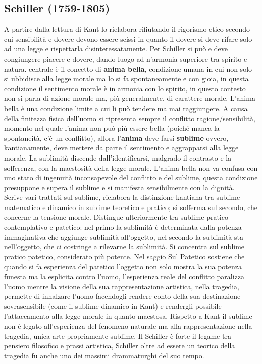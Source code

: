 \documentclass[10pt,a4paper]{article}
\begin{document}
\subsection{Schiller (1759-1805)}
A partire dalla lettura di Kant lo rielabora rifiutando il rigorismo etico secondo cui sensibilità e dovere devono essere scissi in quanto il dovere si deve rifare solo ad una legge e rispettarla disinteressatamente. Per Schiller si può e deve congiungere piacere e dovere, dando luogo ad n'armonia superiore tra spirito e natura. centrale è il concetto di \textbf{anima bella}, condizione umana in cui non solo si ubbidisce alla legge morale ma lo si fa spontaneamente e con gioia, in questa condizione il sentimento morale è in armonia con lo spirito, in questo contesto non si parla di azione morale ma, più generalmente, di carattere morale. L'anima bella è una condizione limite a cui li può tendere ma mai raggiungere. A causa della finitezza fisica dell'uomo si ripresenta sempre il conflitto ragione/sensibilità, momento nel quale l'anima non può più essere bella (poiché manca la spontaneità, c'è un conflitto), allora l'\textbf{anima} deve farsi \textbf{sublime} ovvero, kantianamente, deve mettere da parte il sentimento e aggrapparsi alla legge morale. La sublimità discende dall'identificarsi, malgrado il contrasto e la sofferenza, con la maestosità della legge morale. L'anima bella non va confusa con uno stato di ingenuità inconsapevole del conflitto e del sublime, questa condizione presuppone e supera il sublime e si manifesta sensibilmente con la dignità.\\
Scrive vari trattati sul sublime, rielabora la distinzione kantiana tra sublime matematico e dinamico in sublime teoretico e pratico; si sofferma sul secondo, che concerne la tensione morale. Distingue ulteriormente tra sublime pratico contemplativo e patetico: nel primo la sublimità è determinata dalla potenza immaginativa che aggiunge sublimità all'oggetto, nel secondo la sublimità sta nell'oggetto, che ci costringe a rilevarne la sublimità. Si concentra sul sublime pratico patetico, considerato più potente. Nel saggio Sul Patetico sostiene che quando si fa esperienza del patetico l'oggetto non solo mostra la sua potenza funesta ma la esplicita contro l'uomo, l'esperienza reale del conflitto paralizza l'uomo mentre la visione della sua rappresentazione artistica, nella tragedia, permette di innalzare l'uomo facendogli rendere conto della sua destinazione sovrasensibile (come il sublime dinamico in Kant) e rendergli possibile l'attaccamento alla legge morale in quanto maestosa. Rispetto a Kant il sublime non è legato all'esperienza del fenomeno naturale ma alla rappresentazione nella tragedia, unica arte propriamente sublime. Il Schiller è forte il legame tra pensiero filosofico e prassi artistica, Schiller oltre ad essere un teorico della tragedia fu anche uno dei massimi drammaturghi del suo tempo.\\
\end{document}

